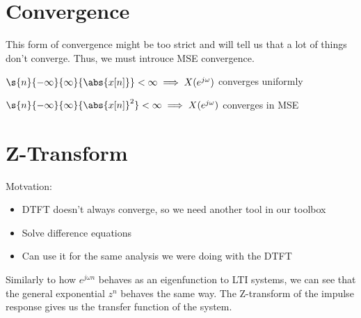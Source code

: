 \documentclass{report}
\begin{document}
\section{Convergence}

\begin{definition}
\end{definition}

This form of convergence might be too strict and will tell us that a lot of things don't converge. Thus, we must introuce MSE convergence.

\begin{definition}
\end{definition}

\begin{theorem}
    $\s{n}{- \infty}{\infty}{\abs{x[n]}} < \infty \implies X(e^{j \omega})$ converges uniformly
\end{theorem}

\begin{theorem}
    $\s{n}{- \infty}{\infty}{\abs{x[n]}^2} < \infty \implies X(e^{j \omega})$ converges in MSE
\end{theorem}

\begin{example}
\end{example}

\section{Z-Transform}
Motvation:
\begin{itemize}
    \item DTFT doesn't always converge, so we need another tool in our toolbox
    \item Solve difference equations
    \item Can use it for the same analysis we were doing with the DTFT
\end{itemize}

Similarly to how $e^{j\omega n}$ behaves as an eigenfunction to LTI systems, we can see that the general exponential $z^n$ behaves the same way.
The Z-transform of the impulse response gives us the transfer function of the system.
\end{document}
